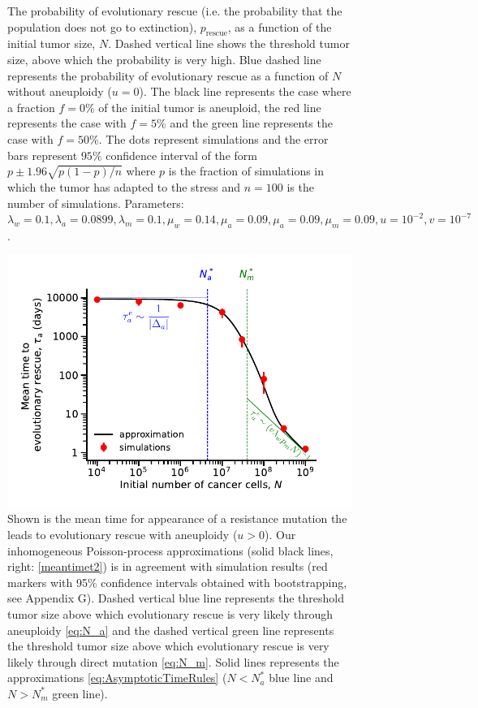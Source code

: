\documentclass[12pt]{extarticle}
\newcommand{\presc}{p_\text{rescue}}
\begin{document}
\begin{appendices}
\begin{figure}
\caption{The probability of evolutionary rescue (i.e. the probability that the population does not go to extinction), $\presc$, as a function of the initial tumor size, $N$. Dashed vertical line shows the threshold tumor size, above which the probability is very high. Blue dashed line represents the probability of evolutionary rescue as a function of $N$ without aneuploidy ($u=0$). The black line represents the case where a fraction $f=0\%$ of the initial tumor is aneuploid, the red line represents the case with $f=5\%$ and the green line represents the case with $f=50\%$. The dots represent simulations and the error bars represent $95\%$ confidence interval of the form $p\pm1.96\sqrt{p\left(1-p\right)/n}$ where $p$ is the fraction of simulations in which the tumor has adapted to the stress and $n=100$ is the number of simulations. Parameters: $\lambda_w=0.1,\lambda_a=0.0899,\lambda_m=0.1,\mu_w=0.14,\mu_a=0.09,\mu_a=0.09,\mu_m=0.09, u=10^{-2}, v=10^{-7}$.}
\label{rescue_prob_sgv}
\end{figure}
\begin{figure}
\vspace*{1\baselineskip}
\includegraphics[width=1\textwidth]{Figures/EvolutionaryRescueTimeComplete.pdf}
\caption{Shown is the mean time for appearance of a resistance mutation the leads to evolutionary rescue with aneuploidy ($u>0$). Our inhomogeneous Poisson-process approximations (solid black lines, right: \cref{meantimet2}) is in agreement with simulation results (red markers with 95\% confidence intervals obtained with bootstrapping, see Appendix G). Dashed vertical blue line represents the threshold tumor size above which evolutionary rescue is very likely through aneuploidy \cref{eq:N_a} and the dashed vertical green line represents the threshold tumor size above which evolutionary rescue is very likely through direct mutation \cref{eq:N_m}. Solid lines represents the approximations \cref{eq:AsymptoticTimeRules} ($N<N_a^*$ blue line and $N>N_m^*$ green line). 
}
\end{figure}
\end{appendices}
\end{document}
